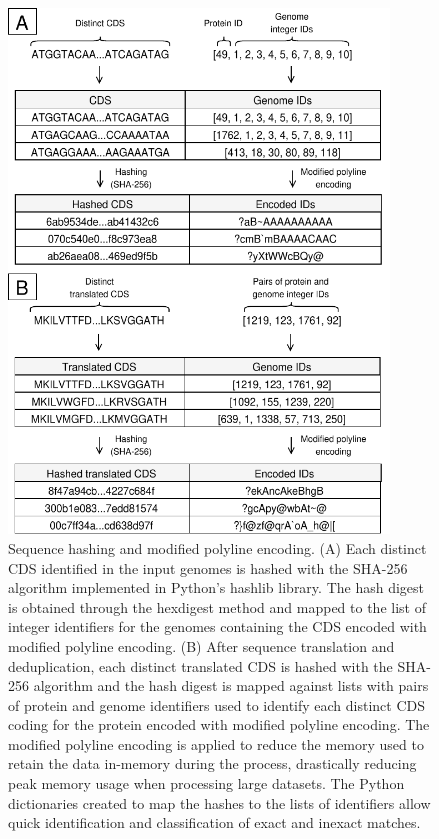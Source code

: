 \newpage
\begin{figure}[h!]
    \centering
    \includegraphics[angle=0,width=0.9\textwidth]{figures/chapter 2/FigureS7.pdf}
    \caption{Sequence hashing and modified polyline encoding. (A) Each distinct CDS identified in the input genomes is hashed with the SHA-256 algorithm implemented in Python's hashlib library. The hash digest is obtained through the hexdigest method and mapped to the list of integer identifiers for the genomes containing the CDS encoded with modified polyline encoding. (B) After sequence translation and deduplication, each distinct translated CDS is hashed with the SHA-256 algorithm and the hash digest is mapped against lists with pairs of protein and genome identifiers used to identify each distinct CDS coding for the protein encoded with modified polyline encoding. The modified polyline encoding is applied to reduce the memory used to retain the data in-memory during the process, drastically reducing peak memory usage when processing large datasets. The Python dictionaries created to map the hashes to the lists of identifiers allow quick identification and classification of exact and inexact matches.}
    \label{fig:chap2_figureS7}
\end{figure}

